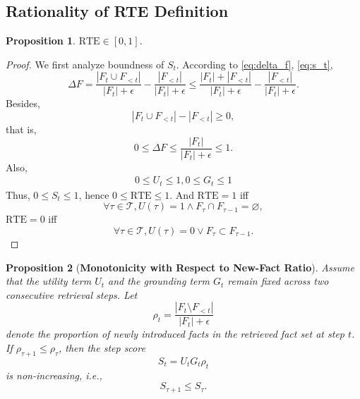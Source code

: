 \documentclass{article} %
\newtheorem{proposition}{Proposition}
\newcommand{\df}{\Delta F}
\newcommand{\facts}{F}
\begin{document}
\subsection{Rationality of RTE Definition}
\begin{proposition}
    $\mathrm{RTE}\in\left[0,1\right]$.
\end{proposition}
\begin{proof}
    We first analyze boundness of $S_t$. According to \eqref{eq:delta_f}, \eqref{eq:s_t},
    \begin{equation}
        \df=\frac{|\facts_t \cup \facts_{<t}|}{|\facts_t|+\epsilon} - \frac{|\facts_{<t}|}{|\facts_t|+\epsilon}\leq \frac{|\facts_t| + |\facts_{<t}|}{|\facts_t|+\epsilon}-\frac{|\facts_{<t}|}{|\facts_t|+\epsilon}.
    \end{equation}
    Besides,
    \begin{equation}
        |\facts_t \cup \facts_{<t}|-|\facts_{<t}|\geq 0,
    \end{equation}
    that is,
    \begin{equation}
        0\leq \df\leq \frac{|\facts_t|}{|\facts_t|+\epsilon}\leq 1.
    \end{equation}
    Also, 
    \begin{align}
        0\leq U_t\leq 1,
        0\leq G_t\leq 1
    \end{align}
    Thus, $0\leq S_t\leq 1$, hence $0\leq \mathrm{RTE}\leq 1$. And $\mathrm{RTE}=1$ iff 
    \begin{equation}
        \forall \tau\in\mathcal{T},U(\tau)=1\land \facts_\tau\cap\facts_{\tau-1}=\varnothing,
    \end{equation}
    $\mathrm{RTE}=0$ iff 
    \begin{equation}
        \forall \tau \in\mathcal{T},U(\tau)=0\lor \facts_\tau\subset\facts_{\tau-1}.
    \end{equation}
\end{proof}
\begin{proposition}[\textbf{Monotonicity with Respect to New-Fact Ratio}]
Assume that the utility term $U_t$ and the grounding term $G_t$ remain fixed across two consecutive retrieval steps. Let
\[
\rho_t =
\frac{|F_t\setminus F_{<t}|}{|F_t|+\epsilon}
\]
denote the proportion of newly introduced facts in the retrieved fact set at step $t$. 
If $\rho_{\tau+1}\le \rho_{\tau}$, then the step score
\[
S_t = U_tG_t\rho_t
\]
is non-increasing, i.e.,
\[
S_{\tau+1}\le S_{\tau}.
\]
\end{proposition}
\end{document}
